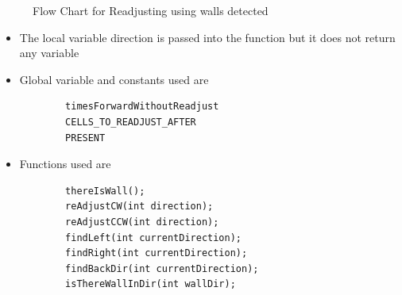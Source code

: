 \documentclass[11pt]{article}
\begin{document}
\begin{itemize}
\begin{figure}[htp]
\caption{Flow Chart for Readjusting using walls detected}
\label{}
\end{figure}
	\begin{itemize}
	\item The local variable direction is passed into the function but it does not return any variable
	\item Global variable and constants used are
	\begin{verbatim}
		timesForwardWithoutReadjust
		CELLS_TO_READJUST_AFTER
		PRESENT
	\end{verbatim}
	\item Functions used are
	\begin{verbatim}
		thereIsWall();
		reAdjustCW(int direction);
		reAdjustCCW(int direction);
		findLeft(int currentDirection);
		findRight(int currentDirection);
		findBackDir(int currentDirection);
		isThereWallInDir(int wallDir);
	\end{verbatim}
	\end{itemize}
\end{itemize}
\newpage

\end{document}
